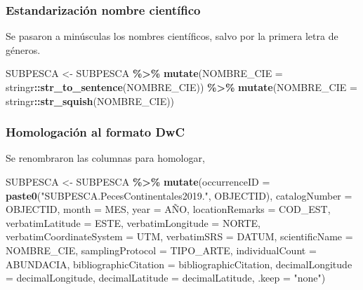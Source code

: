 \documentclass[sn-apa,pdflatex]{sn-jnl}
\newenvironment{Shaded}{\begin{snugshade}}{\end{snugshade}}
\newcommand{\AttributeTok}[1]{\textcolor[rgb]{0.13,0.29,0.53}{#1}}
\newcommand{\FunctionTok}[1]{\textcolor[rgb]{0.13,0.29,0.53}{\textbf{#1}}}
\newcommand{\NormalTok}[1]{#1}
\newcommand{\OtherTok}[1]{\textcolor[rgb]{0.56,0.35,0.01}{#1}}
\newcommand{\SpecialCharTok}[1]{\textcolor[rgb]{0.81,0.36,0.00}{\textbf{#1}}}
\newcommand{\StringTok}[1]{\textcolor[rgb]{0.31,0.60,0.02}{#1}}
\begin{document}
\subsubsection{Estandarización nombre
científico}\label{estandarizaciuxf3n-nombre-cientuxedfico}

Se pasaron a minúsculas los nombres científicos, salvo por la primera
letra de géneros.

\begin{Shaded}
\begin{Highlighting}[]
\NormalTok{SUBPESCA }\OtherTok{\textless{}{-}}\NormalTok{ SUBPESCA }\SpecialCharTok{\%\textgreater{}\%}
    \FunctionTok{mutate}\NormalTok{(}\AttributeTok{NOMBRE\_CIE =}\NormalTok{ stringr}\SpecialCharTok{::}\FunctionTok{str\_to\_sentence}\NormalTok{(NOMBRE\_CIE)) }\SpecialCharTok{\%\textgreater{}\%}
    \FunctionTok{mutate}\NormalTok{(}\AttributeTok{NOMBRE\_CIE =}\NormalTok{ stringr}\SpecialCharTok{::}\FunctionTok{str\_squish}\NormalTok{(NOMBRE\_CIE))}
\end{Highlighting}
\end{Shaded}

\subsubsection{Homologación al formato
DwC}\label{homologaciuxf3n-al-formato-dwc-1}

Se renombraron las columnas para homologar,

\begin{Shaded}
\begin{Highlighting}[]
\NormalTok{SUBPESCA }\OtherTok{\textless{}{-}}\NormalTok{ SUBPESCA }\SpecialCharTok{\%\textgreater{}\%}
    \FunctionTok{mutate}\NormalTok{(}\AttributeTok{occurrenceID =} \FunctionTok{paste0}\NormalTok{(}\StringTok{"SUBPESCA.PecesContinentales2019."}\NormalTok{,}
\NormalTok{        OBJECTID), }\AttributeTok{catalogNumber =}\NormalTok{ OBJECTID, }\AttributeTok{month =}\NormalTok{ MES, }\AttributeTok{year =}\NormalTok{ AÑO,}
        \AttributeTok{locationRemarks =}\NormalTok{ COD\_EST, }\AttributeTok{verbatimLatitude =}\NormalTok{ ESTE, }\AttributeTok{verbatimLongitude =}\NormalTok{ NORTE,}
        \AttributeTok{verbatimCoordinateSystem =}\NormalTok{ UTM, }\AttributeTok{verbatimSRS =}\NormalTok{ DATUM,}
        \AttributeTok{scientificName =}\NormalTok{ NOMBRE\_CIE, }\AttributeTok{samplingProtocol =}\NormalTok{ TIPO\_ARTE,}
        \AttributeTok{individualCount =}\NormalTok{ ABUNDACIA, }\AttributeTok{bibliographicCitation =}\NormalTok{ bibliographicCitation,}
        \AttributeTok{decimalLongitude =}\NormalTok{ decimalLongitude, }\AttributeTok{decimalLatitude =}\NormalTok{ decimalLatitude,}
        \AttributeTok{.keep =} \StringTok{"none"}\NormalTok{)}
\end{Highlighting}
\end{Shaded}
\end{document}
